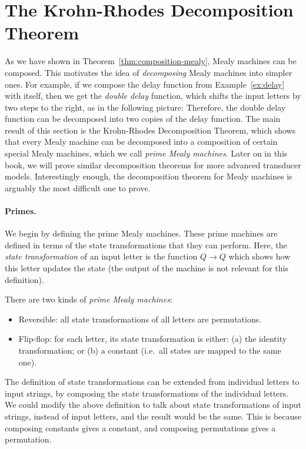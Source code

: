 
\section{The Krohn-Rhodes Decomposition Theorem}
\label{sec:krohn-rhodes}
As we have shown in Theorem~\ref{thm:composition-mealy}, Mealy machines can be composed. This motivates the idea of \emph{decomposing} Mealy machines into simpler ones. For example, if we compose the delay function from Example~\ref{ex:delay} with itself, then we get the \emph{double delay} function, which shifts the input letters by two steps to the right, as in the following picture: 
Therefore, the double delay function can be decomposed into two copies of the delay function. The main result of this section is the Krohn-Rhodes Decomposition Theorem, which shows that every Mealy machine can be decomposed into a composition of certain special Mealy machines, which we call \emph{prime Mealy machines}. Later on in this book, we will prove similar decomposition theorems for more advanced transducer models. Interestingly enough, the decomposition theorem for Mealy machines is arguably the most difficult one to prove.

\paragraph*{Primes.} We begin by defining the prime Mealy machines. These prime machines are defined in terms of the state transformations that they can perform. Here, the \emph{state transformation} of an input letter is the function $Q \to Q$ which shows how this letter updates the state (the output of the machine is not relevant for this definition).


\begin{definition}\label{def:prime-mealy-machines}
    There are two kinds of  \emph{prime Mealy machines}:
        \begin{itemize}
        \item Reversible: all state transformations of all letters  are permutations.
        \item Flip-flop: for each letter, its  state transformation is either: (a) the identity transformation; or (b) a constant (i.e.~all states are mapped to the same one). 
    \end{itemize}
\end{definition}

The definition of state transformations can be extended from individual letters to  input strings, by  composing the state transformations of the individual letters. We could modify the above definition to talk about state transformations of input strings, instead of input letters, and the result would be the same. This is because  composing constants gives a constant, and composing permutations gives a permutation. 

